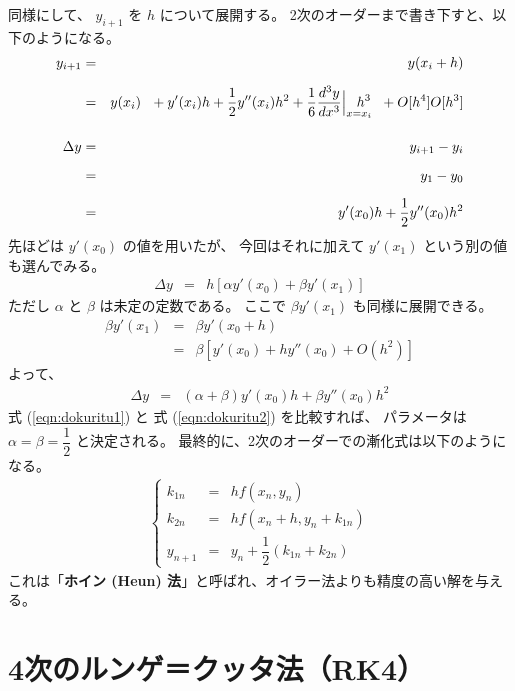 \documentclass[uplatex,a4j,12pt,dvipdfmx]{jsarticle}
\begin{document}
同様にして、
$y_{i+1}$ を $h$ について展開する。
2次のオーダーまで書き下すと、以下のようになる。
\begin{eqnarray}
	y_{i+1} &=&
	y(x_{i} + h)
	\nonumber \\[2mm] &=&
	y(x_{i}) \ \
	+
	y'(x_{i}) h
	+
	\dfrac{1}{2} y''(x_{i}) h^{2}
	+
	\dfrac{1}{6} \dfrac{d^{3}y}{dx^{3}} \Big|_{x=x_{i}} \hspace{-4mm} h^{3} \ \
	+
	O[h^{4}]
	O[h^{3}]
	\\[4mm]
	\Delta y
	&=&
	y_{i+1} - y_{i}
	\nonumber \\[2mm] &=&
	y_{1} - y_{0}
	\nonumber \\[2mm] &=&
	y'(x_{0}) h
	+
	\dfrac{1}{2} y''(x_{0}) h^{2}
	\label{eqn:dokuritu1}
\end{eqnarray}
先ほどは $y'(x_{0})$ の値を用いたが、
今回はそれに加えて $y'(x_{1})$ という別の値も選んでみる。
\begin{eqnarray}
	\Delta y
	&=&
	h [ \alpha y'(x_{0}) + \beta y'(x_{1}) ]
\end{eqnarray}
ただし $\alpha$ と $\beta$ は未定の定数である。
ここで $\beta y'(x_{1})$ も同様に展開できる。
\begin{eqnarray}
	\beta y'(x_{1})
	&=&
	\beta y'(x_{0}+h)
	\nonumber \\[2mm] &=&
	\beta [ y'(x_{0}) + h y''(x_{0}) +O(h^{2}) ]
\end{eqnarray}
よって、
\begin{eqnarray}
	\Delta y
	&=&
	( \alpha + \beta ) y'(x_{0}) h + \beta y''(x_{0}) h^{2}
	\label{eqn:dokuritu2}
\end{eqnarray}
式 (\ref{eqn:dokuritu1}) と
式 (\ref{eqn:dokuritu2}) を比較すれば、
パラメータは $\alpha=\beta=\dfrac{1}{2}$ と決定される。
最終的に、2次のオーダーでの漸化式は以下のようになる。
\begin{eqnarray}
	\left\{
	\begin{array}{rcl}
		k_{1n}
		 & = &
		h f(x_{n},y_{n})
		\\[2mm]
		k_{2n}
		 & = &
		h f(x_{n}+h,y_{n}+k_{1n})
		\\[2mm]
		y_{n+1}
		 & = &
		y_{n} + \dfrac{1}{2} (k_{1n} + k_{2n})
	\end{array}
	\right.
\end{eqnarray}
これは「\textbf{ホイン (Heun) 法}」と呼ばれ、オイラー法よりも精度の高い解を与える。
\section{4次のルンゲ＝クッタ法（RK4）}
\end{document}

